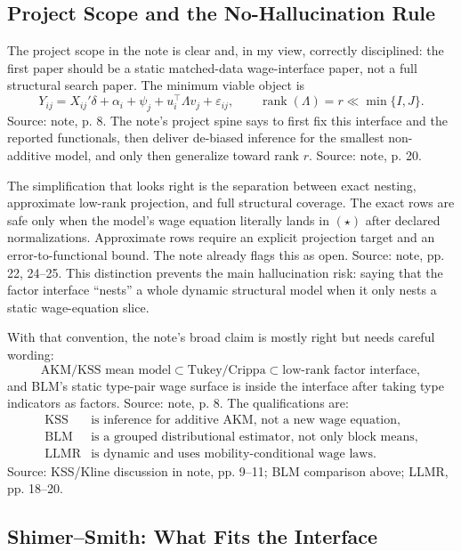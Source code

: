 \documentclass[11pt]{article}
\begin{document}
\subsection{Project Scope and the No-Hallucination Rule}

The project scope in the note is clear and, in my view, correctly disciplined:
the first paper should be a static matched-data wage-interface paper, not a full
structural search paper. The minimum viable object is
\[
Y_{ij}=X_{ij}'\delta+\alpha_i+\psi_j+u_i^\top\Lambda v_j+\varepsilon_{ij},
\qquad
\operatorname{rank}(\Lambda)=r\ll \min\{I,J\}.
\tag{$\star$}
\]
Source: note, p. 8. The note's project spine says to first fix this interface and
the reported functionals, then deliver de-biased inference for the smallest
non-additive model, and only then generalize toward rank $r$. Source: note, p. 20.

The simplification that looks right is the separation between exact nesting,
approximate low-rank projection, and full structural coverage. The exact rows are
safe only when the model's wage equation literally lands in $(\star)$ after declared
normalizations. Approximate rows require an explicit projection target and an
error-to-functional bound. The note already flags this as open. Source: note,
pp. 22, 24--25. This distinction prevents the main hallucination risk: saying that
the factor interface ``nests'' a whole dynamic structural model when it only nests a
static wage-equation slice.

With that convention, the note's broad claim is mostly right but needs careful
wording:
\[
\text{AKM/KSS mean model} \subset \text{Tukey/Crippa} \subset
\text{low-rank factor interface},
\]
and BLM's static type-pair wage surface is inside the interface after taking type
indicators as factors. Source: note, p. 8. The qualifications are:
\[
\begin{array}{ll}
\text{KSS} & \text{is inference for additive AKM, not a new wage equation,}\\
\text{BLM} & \text{is a grouped distributional estimator, not only block means,}\\
\text{LLMR} & \text{is dynamic and uses mobility-conditional wage laws.}
\end{array}
\]
Source: KSS/Kline discussion in note, pp. 9--11; BLM comparison above; LLMR,
pp. 18--20.

\subsection{Shimer--Smith: What Fits the Interface}
\end{document}
